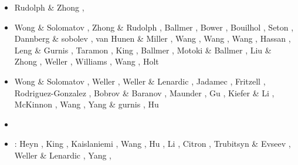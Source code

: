 \begin{itemize}
\begin{scriptsize}
\begin{itemize}
\item[\twothousandfourteen] Rudolph \& Zhong \cite{ruzh14}, \cite{flgw14}
                      \cite{budt14}\cite{kava14}
                      \cite{arfw14}\cite{wavp14}
                      \cite{seki14}\cite{agvg14}
                      \cite{mabv14}\cite{zhu14}

\item[\twothousandfifteen] Wong \& Solomatov \cite{woso15}, Zhong \& Rudolph \cite{zhru15}, 
                    Ballmer \etal \cite{bacs15}, Bower \etal \cite{bogf15},
                    Bouilhol \etal \cite{bomv15}, Seton \etal \cite{sefw15},
                    Dannberg \& sobolev \cite{daso15}, van Hunen \& Miller \cite{vami15},
                    Wang \etal \cite{wazh15}, Wang \etal \cite{wavp15},
                    Wang \etal \cite{waav15}, Hassan \etal \cite{hafg15},
                    Leng \& Gurnis \cite{legu15}, Taramon \etal \cite{tarn15}, 
                    King \cite{king15},
                    Ballmer \etal \cite{basn15}, Motoki \& Ballmer \cite{moba15},
                    Liu \& Zhong \cite{lizh15}, Weller \etal \cite{welo15},
                    Williams \etal \cite{wilm15}, Wang \etal \cite{wahz15},
                    Holt \etal \cite{hobb15}
\item[\twothousandsixteen] Wong \& Solomatov \cite{woso16a,woso16b}, Weller \etal \cite{welm16},
                    Weller \& Lenardic \cite{wele16}, Jadamec \cite{jada16,jada16b},
                    Fritzell \etal \cite{frbs16}, Rodriguez-Gonzalez \etal \cite{robn16},
                    Bobrov \& Baranov \cite{boba16}, Maunder \etal \cite{mavm16},
                    Gu \etal \cite{gulm16}, Kiefer \& Li \cite{kili16},
                    McKinnon \etal \cite{mcnw16}, Wang \etal \cite{wahz16},
                    Yang \& gurnis \cite{yagu16}, Hu \etal \cite{hulh16}
\item[\twothousandseventeen] \cite{aggv17}\cite{maav17}
                       \cite{frbm17}\cite{haja17}
                       \cite{majf17}\cite{ghts17}
                       \cite{taac17}\cite{yagz17}
                       \cite{lizh17}\cite{hobe17}
\item[\twothousandeighteen]: Heyn \etal \cite{hect18}, King \cite{king18},
                    Kaislaniemi \etal \cite{kavb18}, Wang \etal \cite{wavp18},
                    Hu \etal \cite{hulz18}, Li \etal \cite{lizo18},
                    Citron \etal \cite{cimt18}, Trubitsyn \& Evseev \cite{trev18},
                    Weller \& Lenardic \cite{wele18}, Yang \etal \cite{yagz18},

\end{itemize}
\end{scriptsize}
\end{itemize}
